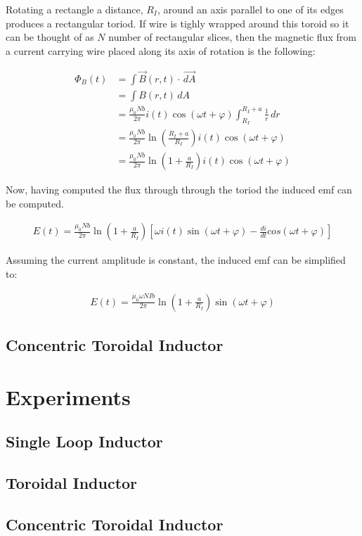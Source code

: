 \documentclass{article}
\numberwithin{equation}{subsection}
\begin{document}
Rotating a rectangle a distance, \(R_I\), around an axis parallel to one of its edges produces a rectangular toriod. If
wire is tighly wrapped around this toroid so it can be thought of as \(N\) number of rectangular slices,
then the magnetic flux from a current carrying wire placed along its axis of rotation is the following: 

\begin{equation}
\begin{split}
\Phi_B(t) & = \int \vec{B}(r, t) \cdot \, \vec{dA} \\
  & = \int B(r, t) \, dA \\
  & = \frac{\mu_0 N b}{2 \pi} i(t) \cos(\omega t + \varphi) \int_{R_I}^{R_I + a} \frac{1}{r} \, dr \\
  & = \frac{\mu_0 N b}{2 \pi} \ln(\frac{R_I + a}{R_I}) i(t) \cos(\omega t + \varphi) \\
  & = \frac{\mu_0 N b}{2 \pi} \ln(1 + \frac{a}{R_I}) i(t) \cos(\omega t + \varphi)
\end{split}
\end{equation}

Now, having computed the flux through through the toriod the induced emf can be computed.

\begin{equation}
\begin{split}
E(t) = \frac{\mu_0 N b}{2 \pi} \ln(1 + \frac{a}{R_I}) [ \omega i(t) \sin(\omega t + \varphi) - \frac{di}{dt} cos(\omega t + \varphi)]
\end{split}
\end{equation}

Assuming the current amplitude is constant, the induced emf can be simplified to:

\begin{equation}
\begin{split}
E(t) = \frac{\mu_0 \omega N I b}{2 \pi} \ln(1 + \frac{a}{R_I}) \sin(\omega t + \varphi)
\end{split}
\end{equation}


\subsection{Concentric Toroidal Inductor}

\section{Experiments}

\subsection{Single Loop Inductor}

\subsection{Toroidal Inductor}

\subsection{Concentric Toroidal Inductor}
\end{document}
